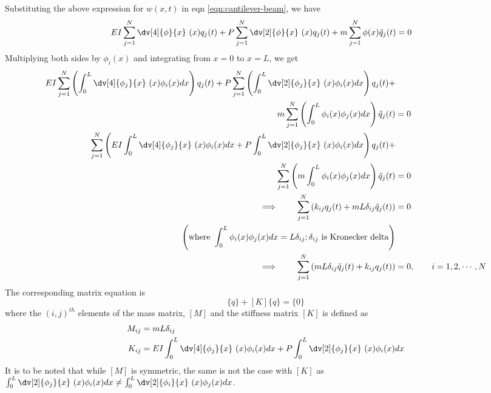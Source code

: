 Substituting the above expression for $w(x,t)$ in eqn \ref{eqn:cantilever-beam}, we have
\begin{align*}
EI \sum_{j=1}^N \dv[4]{\phi}{x}~(x) q_j(t) + P\sum_{j=1}^N \dv[2]{\phi}{x}~(x) q_j(t) + m\sum_{j=1}^N\phi (x) \ddot{q}_j(t) &= 0
\end{align*}
Multiplying both sides by $\phi_i (x)$ and integrating from $x=0$ to $x=L$, we get
\begin{align*}
EI \sum_{j=1}^N \left(\int_{0}^L  \dv[4]{\phi_j}{x}~(x)\phi_i (x) dx\right)  q_j(t) + P\sum_{j=1}^N \left(\int_{0}^L  \dv[2]{\phi_j}{x}~(x)\phi_i (x) dx\right)  q_j(t) + & \\
\phantom{=} \qquad m\sum_{j=1}^N\left(\int_{0}^L \phi_i(x)\phi_j (x)dx\right)  \ddot{q}_j(t) &= 0 \\
\sum_{j=1}^N \left(EI  \int_{0}^L  \dv[4]{\phi_j}{x}~(x)\phi_i (x) dx + P\int_{0}^L  \dv[2]{\phi_j}{x}~(x)\phi_i (x) dx\right)  q_j(t) + & \\
\phantom{=}  \sum_{j=1}^N\left(m\int_{0}^L \phi_i(x)\phi_j (x)dx\right)  \ddot{q}_j(t) &= 0 \\
\implies \qquad \sum_{j=1}^N\left(  k_{ij}q_j(t) + mL\delta_{ij} \ddot{q}_j(t) \right) &= 0 \\
\left( \text{where } \int_0^L \phi_i(x)\phi_j (x)dx = L \delta_{ij}; \delta_{ij} \text{ is Kronecker delta}\right)  & \\
\implies \qquad \sum_{j=1}^N\left(  mL\delta_{ij} \ddot{q}_j(t) +  k_{ij}q_j(t) \right) &= 0, \qquad i=1,2,\cdots, N
\end{align*}
The corresponding matrix equation is 
\begin{equation}
[M]\{\ddot{q}\} + [K]\{q\} = \{0\} \label{eqn:matrix-equation}
\end{equation}
where the $(i,j)^{th}$ elements of the mass matrix, $[M]$ and the stiffness matrix $[K]$ is defined as
\begin{align*}
M_{ij} &= mL\delta_{ij} \\
K_{ij} &= EI  \int_{0}^L  \dv[4]{\phi_j}{x}~(x)\phi_i (x) dx + P\int_{0}^L  \dv[2]{\phi_j}{x}~(x)\phi_i (x) dx
\end{align*}
It is to be noted that while $[M]$ is symmetric, the same is not the case with $[K]$ as $\int_{0}^L  \dv[2]{\phi_j}{x}~(x)\phi_i (x) dx \neq \int_{0}^L  \dv[2]{\phi_i}{x}~(x)\phi_j (x) dx$.

